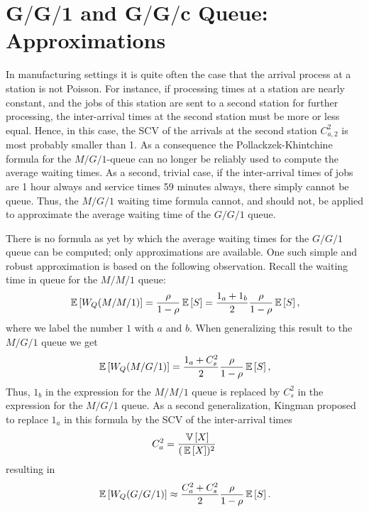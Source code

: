 \section
[$G/G/1$  and $G/G/c$ Queue: Approximations]
{$\mathbf{G/G/1}$  and $\mathbf{G/G/c}$ Queue: Approximations}
\label{sec:gg1}

In manufacturing settings it is quite often the case that the arrival
process at a station is not Poisson. For instance, if processing times
at a station are nearly constant, and the jobs of this station are
sent to a second station for further processing, the inter-arrival
times at the second station must be more or less equal. Hence, in this
case, the SCV of the arrivals at the second station $C_{a,2}^2$ is
most probably smaller than 1. As a consequence the
Pollackzek-Khintchine formula for the $M/G/1$-queue can no longer be
reliably used to compute the average waiting times.  As a second,
trivial case, if the inter-arrival times of jobs are 1 hour always and
service times 59 minutes always, there simply cannot be queue. Thus,
the $M/G/1$ waiting time formula cannot, and should not, be applied to
approximate the average waiting time of the $G/G/1$ queue. 

There is no formula as yet by which the average waiting times for the
$G/G/1$ queue can be computed; only approximations are available. One
such simple and robust approximation is based on the following
observation. Recall  the waiting time in queue for the $M/M/1$ queue:
\begin{equation*}
  \,\mathbb{E}\left[W_Q(M/M/1)\right] = \frac{\rho}{1-\rho} \,\mathbb{E}\left[S\right] = 
\frac{1_a + 1_b}2 \frac{\rho}{1-\rho} \,\mathbb{E}\left[S\right],
\end{equation*}
where we label the number $1$ with $a$ and $b$. When generalizing this
result to the $M/G/1$ queue we get
\begin{equation*}
  \,\mathbb{E}\left[W_Q(M/G/1)\right] = \frac{1_a + C_s^2}2 \frac{\rho}{1-\rho} \,\mathbb{E}\left[S\right],
\end{equation*}
Thus, $1_b$ in the expression for the $M/M/1$ queue is replaced by
$C_s^2$ in the expression for the $M/G/1$ queue. As a second
generalization, Kingman proposed to replace $1_a$ in this formula by
the SCV of the inter-arrival times
\begin{equation*}
C_a^2 = \frac{\,\mathbb{V}\left[X\right]}{(\,\mathbb{E}\left[X\right])^2}
\end{equation*}
resulting in
\begin{equation*}
  \,\mathbb{E}\left[W_Q(G/G/1)\right] \approx \frac{C_a^2 + C_s^2}2 \frac{\rho}{1-\rho} \,\mathbb{E}\left[S\right].
\end{equation*}

